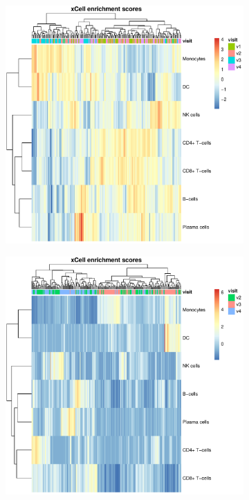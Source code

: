\begin{figure}
    \centering
    \begin{subfigure}[b]{0.65\textwidth}
        \centering
        \includegraphics[width=1.0\textwidth,page=3]{mainmatter/figures/chapter_03/get_xCell_estimates.dataset_array.plots.pdf}
    \end{subfigure}
    \bigskip\vfill
    \begin{subfigure}[b]{0.65\textwidth}
        \centering
        \includegraphics[width=1.0\textwidth,page=3]{mainmatter/figures/chapter_03/get_xCell_estimates.dataset_rnaseq.plots.pdf}

\end{subfigure}
\end{figure}
